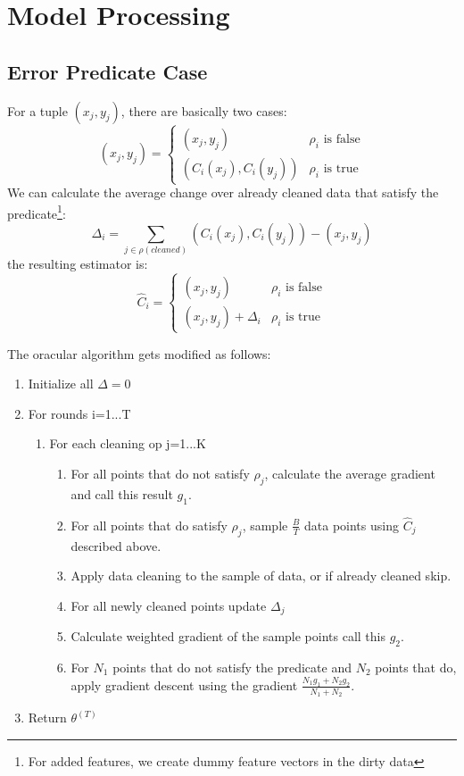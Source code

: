 \section{Model Processing}

\subsection{Error Predicate Case} 
For a tuple $(x_j,y_j)$, there are basically two cases:
\[
(x_j,y_j)= \begin{cases} (x_j,y_j) &\rho_i \text{ is false} \\ 
(C_i(x_j),C_i(y_j)) & \rho_i \text{ is true} 
\end{cases} 
\]
We can calculate the average change over already cleaned data that satisfy the predicate\footnote{For added features, we create dummy feature vectors in the dirty data}:
\[
\Delta_i = \sum_{j \in \rho(cleaned)} (C_i(x_j),C_i(y_j)) - (x_j,y_j)
\]
the resulting estimator is:
\[
\hat{C}_i= \begin{cases} (x_j,y_j) &\rho_i \text{ is false} \\ 
(x_j,y_j) + \Delta_i & \rho_i \text{ is true} 
\end{cases} 
\]

The oracular algorithm gets modified as follows:
\begin{enumerate}[noitemsep]
\item Initialize all $\Delta = 0$
\item For rounds i=1...T
\begin{enumerate}
	\item For each cleaning op j=1...K
	\begin{enumerate}
		\item For all points that do not satisfy $\rho_j$, calculate the average gradient and call this result $g_1$.
		\item For all points that do satisfy $\rho_j$, sample $\frac{B}{T}$ data points using $\hat{C}_j$ described above.
		\item Apply data cleaning to the sample of data, or if already cleaned skip.
		\item For all newly cleaned points update $\Delta_j$
		\item Calculate weighted gradient of the sample points call this $g_2$.
		\item For $N_1$ points that do not satisfy the predicate and $N_2$ points that do,  apply gradient descent using the gradient $\frac{N_1g_1 + N_2g_2}{N_1 + N_2}$.
	\end{enumerate}
\end{enumerate}
\item Return $\theta^{(T)}$
\end{enumerate} 

